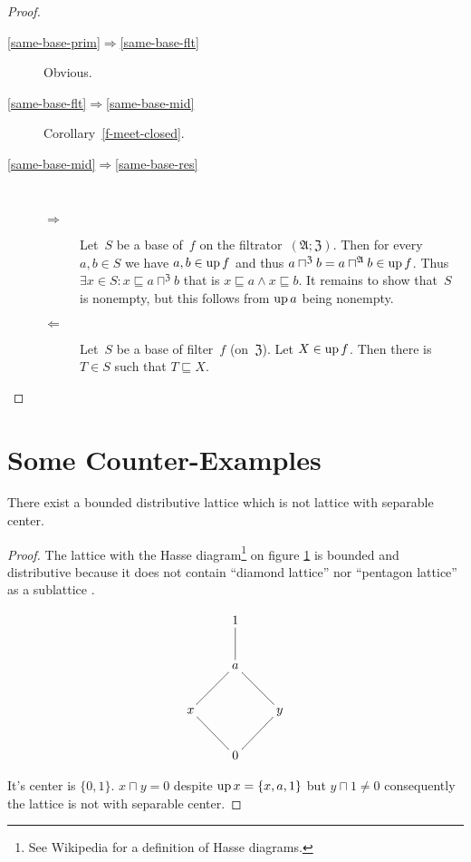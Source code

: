 \begin{proof}
~
\begin{description}
\item[\ref{same-base-prim}$\Rightarrow$\ref{same-base-flt}] Obvious.

\item[\ref{same-base-flt}$\Rightarrow$\ref{same-base-mid}] Corollary~\ref{f-meet-closed}.

\item[\ref{same-base-mid}$\Rightarrow$\ref{same-base-res}] ~
  \begin{description}
  \item[$\Rightarrow$] Let~$S$ be a base of~$f$ on the filtrator~$(\mathfrak{A};\mathfrak{Z})$.
  Then for every $a,b\in S$ we have $a,b\in\operatorname{up} f$ and thus $a\sqcap^{\mathfrak{Z}}b=a\sqcap^{\mathfrak{A}}b\in\operatorname{up} f$.
  Thus $\exists x\in S:x\sqsubseteq a\sqcap^{\mathfrak{Z}}b$ that is $x\sqsubseteq a\land x\sqsubseteq b$.
  It remains to show that~$S$ is nonempty, but this follows from $\operatorname{up} a$ being nonempty.

  \item[$\Leftarrow$] Let~$S$ be a base of filter~$f$ (on~$\mathfrak{Z}$).
  Let $X\in\operatorname{up} f$. Then there is $T\in S$ such that $T\sqsubseteq X$.
  \end{description}
\end{description}
\end{proof}

\section{Some Counter-Examples}
\begin{example}
There exist a bounded distributive lattice which is not lattice with
separable center.\end{example}
\begin{proof}
The lattice with the Hasse diagram\footnote{See Wikipedia for a definition of Hasse diagrams.}
on figure \ref{not-sep-center} is bounded and distributive because
it does not contain ``diamond lattice'' nor ``pentagon lattice''
as a sublattice \cite{wiki:distributive-lattice}.
\begin{figure}
\caption{\label{not-sep-center}}
\[
\xymatrix{ & 1\\
 & a\ar@{-}[u]\\
x\ar@{-}[ur] &  & y\ar@{-}[ul]\\
 & 0\ar@{-}[ul]\ar@{-}[ur]
}
\]
\end{figure}


It's center is $\{0,1\}$. $x\sqcap y=0$ despite $\operatorname{up} x=\{x,a,1\}$
but $y\sqcap1\ne 0$ consequently the lattice is not with separable
center.\end{proof}

